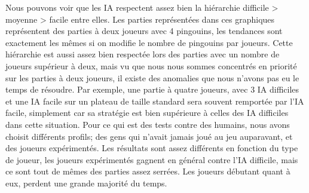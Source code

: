 \documentclass{report}
\begin{document}
Nous pouvons voir que les IA respectent assez bien la hiérarchie difficile > moyenne > facile entre elles. 
Les parties représentées dans ces graphiques représentent des parties à deux joueurs avec 4 pingouins, les tendances sont exactement les mêmes si on modifie le nombre de pingouins par joueurs.
Cette hiérarchie est aussi assez bien respectée lors des parties avec un nombre de joueurs supérieur à deux, mais vu que nous nous sommes concentrés en priorité sur les parties à deux joueurs, il existe des anomalies que nous n'avons pas eu le temps de résoudre.
\newline
Par exemple, une partie à quatre joueurs, avec 3 IA difficiles et une IA facile sur un plateau de taille standard sera souvent remportée par l'IA facile, simplement car sa stratégie est bien supérieure à celles des IA difficiles dans cette situation.
\newline
Pour ce qui est des tests contre des humains, nous avons choisit différents profils; des gens qui n'avait jamais joué au jeu auparavant, et des joueurs expérimentés.
Les résultats sont assez différents en fonction du type de joueur, les joueurs expérimentés gagnent en général contre l'IA difficile, mais ce sont tout de mêmes des parties assez serrées.
Les joueurs débutant quant à eux, perdent une grande majorité du temps.
\end{document}
